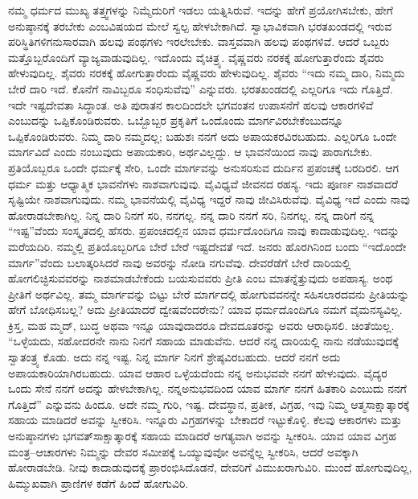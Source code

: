 ನಮ್ಮ ಧರ್ಮದ ಮುಖ್ಯ ತತ್ತ್ವಗಳನ್ನು ನಿಮ್ಮೆದುರಿಗೆ ಇಡಲು ಯತ್ನಿಸಿರುವೆ. ಇದನ್ನು ಹೇಗೆ ಪ್ರಯೋಗಿಸಬೇಕು, ಹೇಗೆ ಅನುಷ್ಠಾನಕ್ಕೆ ತರಬೇಕು ಎಂಬವಿಷಯದ ಮೇಲೆ ಸ್ವಲ್ಪ ಹೇಳಬೇಕಾಗಿದೆ. ಸ್ವಾಭಾವಿಕವಾಗಿ ಭರತಖಂಡದಲ್ಲಿ ಇರುವ ಪರಿಸ್ಥಿತಿಗಳಿಗನುಸಾರವಾಗಿ ಹಲವು ಪಂಥಗಳು ಇರಲೇಬೇಕು. ವಾಸ್ತವವಾಗಿ ಹಲವು ಪಂಥಗಳಿವೆ. ಆದರೆ ಒಬ್ಬರು ಮತ್ತೊಬ್ಬರೊಂದಿಗೆ ವ್ಯಾಜ್ಯವಾಡುವುದಿಲ್ಲ. ಇದೊಂದು ವೈಚಿತ್ರ್ಯ. ವೈಷ್ಣವರು ನರಕಕ್ಕೆ ಹೋಗುತ್ತಾರೆಂದು ಶೈವರು ಹೇಳುವುದಿಲ್ಲ. ಶೈವರು ನರಕಕ್ಕೆ ಹೋಗುತ್ತಾರೆಂದು ವೈಷ್ಣವರು ಹೇಳುವುದಿಲ್ಲ. ಶೈವರು “ಇದು ನಮ್ಮ ದಾರಿ, ನಿಮ್ಮದು ಬೇರೆ ದಾರಿ ಇದೆ. ಕೊನೆಗೆ ನಾವಿಬ್ಬರೂ ಸಂಧಿಸುವೆವು” ಎನ್ನುವರು. ಭರತಖಂಡದಲ್ಲಿ ಎಲ್ಲರಿಗೂ ಇದು ಗೊತ್ತಿದೆ. ಇದೇ ಇಷ್ಟದೇವತಾ ಸಿದ್ಧಾಂತ. ಅತಿ ಪುರಾತನ ಕಾಲದಿಂದಲೇ ಭಗವಂತನ ಉಪಾಸನೆಗೆ ಹಲವು ಆಕಾರಗಳಿವೆ ಎಂಬುದನ್ನು ಒಪ್ಪಿಕೊಂಡಿರುವರು. ಒಬ್ಬೊಬ್ಬರ ಪ್ರಕೃತಿಗೆ ಒಂದೊಂದು ಮಾರ್ಗವಿರಬೇಕೆಂಬುದನ್ನೂ ಒಪ್ಪಿಕೊಂಡಿರುವರು. ನಿಮ್ಮ ದಾರಿ ನಮ್ಮದಲ್ಲ; ಬಹುಶಃ ನನಗೆ ಅದು ಅಪಾಯಕರವಿರಬಹುದು. ಎಲ್ಲರಿಗೂ ಒಂದೇ ಮಾರ್ಗವಿದೆ ಎಂದು ನಂಬುವುದು ಅಪಾಯಕಾರಿ, ಅರ್ಥವಿಲ್ಲದ್ದು. ಆ ಭಾವನೆಯಿಂದ ನಾವು ಪಾರಾಗಬೇಕು. ಪ್ರತಿಯೊಬ್ಬರೂ ಒಂದೇ ಧರ್ಮಕ್ಕೆ ಸೇರಿ, ಒಂದೇ ಮಾರ್ಗವನ್ನು ಅನುಸರಿಸುವ ದುರ್ದಿನ ಪ್ರಪಂಚಕ್ಕೆ ಬರದಿರಲಿ. ಆಗ ಧರ್ಮ ಮತ್ತು ಆಧ್ಯಾತ್ಮಿಕ ಭಾವನೆಗಳು ನಾಶವಾಗುವುವು. ವೈವಿಧ್ಯವೆ ಜೀವನದ ರಹಸ್ಯ. ಇದು ಪೂರ್ಣ ನಾಶವಾದರೆ ಸೃಷ್ಟಿಯೇ ನಾಶವಾಗುವುದು. ನಮ್ಮ ಭಾವನೆಯಲ್ಲಿ ವೈವಿಧ್ಯ ಇದ್ದರೆ ನಾವು ಜೀವಿಸಿರುವೆವು. ವೈವಿಧ್ಯ ಇದೆ ಎಂದು ನಾವು ಹೋರಾಡಬೇಕಾಗಿಲ್ಲ. ನಿನ್ನ ದಾರಿ ನಿನಗೆ ಸರಿ, ನನಗಲ್ಲ. ನನ್ನ ದಾರಿ ನನಗೆ ಸರಿ, ನಿನಗಲ್ಲ. ನನ್ನ ದಾರಿಗೆ ನನ್ನ “ಇಷ್ಟ”ವೆಂದು ಸಂಸ್ಕೃತದಲ್ಲಿ ಹೆಸರು. ಪ್ರಪಂಚದಲ್ಲಿನ ಯಾವ ಧರ್ಮದೊಂದಿಗೂ ನಾವು ಕಾದಾಡುವುದಿಲ್ಲ. ಇದನ್ನು ಮರೆಯದಿರಿ. ನಮ್ಮಲ್ಲಿ ಪ್ರತಿಯೊಬ್ಬರಿಗೂ ಬೇರೆ ಬೇರೆ ಇಷ್ಟದೇವತೆ ಇದೆ. ಜನರು ಹೊರಗಿನಿಂದ ಬಂದು “ಇದೊಂದೇ ಮಾರ್ಗ”ವೆಂದು ಬಲಾತ್ಕರಿಸಿದರೆ ನಾವು ಅವರನ್ನು ನೋಡಿ ನಗುವೆವು. ದೇವರೆಡೆಗೆ ಬೇರೆ ದಾರಿಯಲ್ಲಿ ಹೋಗಲಿಚ್ಛಿಸುವವರನ್ನು ನಾಶಮಾಡಬೇಕೆಂದು ಬಯಸುವವರು ಪ್ರೀತಿ ಎಂಬ ಮಾತನ್ನೆತ್ತುವುದು ಅಪಹಾಸ್ಯ. ಅಂಥ ಪ್ರೀತಿಗೆ ಅರ್ಥವಿಲ್ಲ. ತಮ್ಮ ಮಾರ್ಗವನ್ನು ಬಿಟ್ಟು ಬೇರೆ ಮಾರ್ಗದಲ್ಲಿ ಹೋಗುವವನನ್ನೇ ಸಹಿಸಲಾರದವನು ಪ್ರೀತಿಯನ್ನು ಹೇಗೆ ಬೋಧಿಸಬಲ್ಲ? ಅದು ಪ್ರೀತಿಯಾದರೆ ದ್ವೇಷವೆಂದ\-ರೇನು? ಯಾವ ಧರ್ಮದೊಂದಿಗೂ ನಮಗೆ ವೈಮನಸ್ಯವಿಲ್ಲ. ಕ್ರಿಸ್ತ, ಮಹ ಮ್ಮದ್​, ಬುದ್ಧ ಅಥವಾ ಇನ್ನೂ ಯಾವುದಾದರೂ ದೇವದೂತರನ್ನು ಅವರು ಆರಾಧಿಸಲಿ. ಚಿಂತೆಯಿಲ್ಲ. “ಒಳ್ಳೆಯದು, ಸಹೋದರನೇ ನಾನು ನಿನಗೆ ಸಹಾಯ ಮಾಡುವೆನು. ಆದರೆ ನನ್ನ ದಾರಿಯಲ್ಲಿ ನಾನು ನಡೆಯುವುದಕ್ಕೆ ಸ್ವಾತಂತ್ರ್ಯ ಕೊಡು. ಅದು ನನ್ನ ಇಷ್ಟ. ನಿನ್ನ ಮಾರ್ಗ ನಿನಗೆ ಶ್ರೇಷ್ಠವಿರಬಹುದು. ಆದರೆ ನನಗೆ ಅದು ಅಪಾಯಕಾರಿಯಾಗಿರಬಹುದು. ಯಾವ ಆಹಾರ ಒಳ್ಳೆಯದೆಂದು ನನ್ನ ಅನುಭವವೇ ನನಗೆ ಹೇಳುವುದು. ವೈದ್ಯರ ಒಂದು ಸೇನೆ ನನಗೆ ಅದನ್ನು ಹೇಳಬೇಕಾಗಿಲ್ಲ. ನನ್ನ\break ಅನುಭವದಿಂದ ಯಾವ ಮಾರ್ಗ ನನಗೆ ಹಿತಕಾರಿ ಎಂಬುದು ನನಗೆ ಗೊತ್ತಿದೆ” ಎನ್ನುವನು ಹಿಂದೂ. ಅದೇ ನಮ್ಮ ಗುರಿ, ಇಷ್ಟ. ದೇವಸ್ಥಾನ, ಪ್ರತೀಕ, ವಿಗ್ರಹ, ಇವು ನಿಮ್ಮ ಆತ್ಮಸಾಕ್ಷಾತ್ಕಾರಕ್ಕೆ ಸಹಾಯ ಮಾಡಿದರೆ ಅವನ್ನು ಸ್ವೀಕರಿಸಿ. ಇನ್ನೂರು ವಿಗ್ರಹಗಳನ್ನು ಬೇಕಾದರೆ ಇಟ್ಟುಕೊಳ್ಳಿ. ಕೆಲವು ಆಕಾರಗಳು ಮತ್ತು ಅನುಷ್ಠಾನಗಳು ಭಗವತ್​ ಸಾಕ್ಷಾತ್ಕಾರಕ್ಕೆ ಸಹಾಯ ಮಾಡಿದರೆ ಅಗತ್ಯವಾಗಿ ಅವನ್ನು ಸ್ವೀಕರಿಸಿ. ಯಾವ ಯಾವ ವಿಗ್ರಹ ಮಂತ್ರ–ಆಚಾರಗಳು ನಿಮ್ಮನ್ನು ದೇವರ ಸಮೀಪಕ್ಕೆ ಒಯ್ಯುವುವೋ ಅವನ್ನೆಲ್ಲ ಸ್ವೀಕರಿಸಿ, ಆದರೆ ಅವಕ್ಕಾಗಿ ಹೋರಾಡಬೇಡಿ. ನೀವು ಕಾದಾಡುವುದಕ್ಕೆ ಪ್ರಾರಂಭಿಸಿದೊಡನೆ, ದೇವರಿಗೆ ವಿಮುಖರಾಗುವಿರಿ. ಮುಂದೆ ಹೋಗುವುದಿಲ್ಲ, ಹಿಮ್ಮುಖವಾಗಿ ಪ್ರಾಣಿಗಳ ಕಡೆಗೆ ಹಿಂದೆ ಹೋಗುವಿರಿ. 

